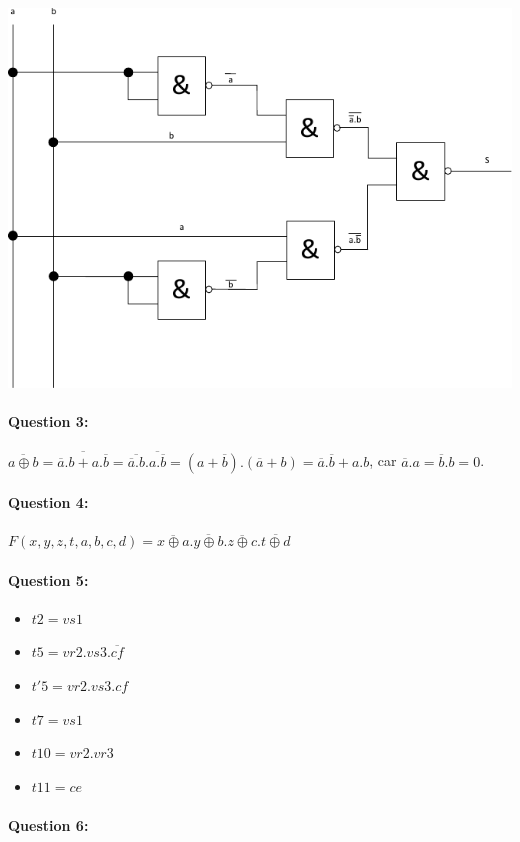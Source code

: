 \begin{center}
 \includegraphics[width=0.7\linewidth]{img/nands}
\end{center}

\paragraph{Question 3:} $\overline{a \oplus b} = \overline{\overline{a}.b+a.\overline{b}}= \overline{\overline{a}.b}.\overline{a.\overline{b}} = (a+\overline{b}).(\overline{a}+b) = \overline{a}.\overline{b} + a.b$, car $\overline{a}.a=\overline{b}.b=0$.

\paragraph{Question 4:} $F(x,y,z,t,a,b,c,d)=\overline{x \oplus a}.\overline{y \oplus b}.\overline{z \oplus c}.\overline{t \oplus d}$

\paragraph{Question 5:}

\begin{itemize}
 \item $t2=vs1$
 \item $t5=vr2.vs3.\overline{cf}$
 \item $t'5=vr2.vs3.cf$
 \item $t7=vs1$
 \item $t10=vr2.vr3$
 \item $t11=ce$
\end{itemize}

\newpage

\paragraph{Question 6:}

